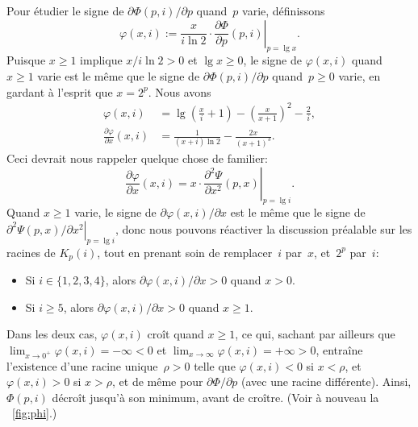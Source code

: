 Pour étudier le signe de \(\partial\Phi(p,i)/\partial p\) quand~\(p\)
varie, définissons
\begin{equation*}
  \varphi(x,i) :=
    \frac{x}{i\ln 2} \cdot
    \left.\frac{\partial\Phi}{\partial p}(p,i)\right|_{p=\lg x}.
\end{equation*}
Puisque \(x \geqslant 1\) implique \(x/i\ln 2 > 0\) et \(\lg x
\geqslant 0\), le signe de \(\varphi(x,i)\) quand~\(x \geqslant 1\)
varie est le même que le signe de \(\partial\Phi(p,i)/\partial p\)
quand~\(p \geqslant 0\) varie, en gardant à l'esprit
que \(x=2^p\). Nous avons
\begin{align*}
\varphi(x,i) &= \lg\left(\frac{x}{i}+1\right) -
\left(\!\frac{x}{x+1}\!\right)^2 - \frac{2}{i},\\
\frac{\partial\varphi}{\partial x}(x,i) &=
\frac{1}{(x+i)\ln 2} - \frac{2x}{(x+1)^3}.
\end{align*}
Ceci devrait nous rappeler quelque chose de familier:
\begin{equation*}
\frac{\partial\varphi}{\partial x}(x,i) =
  x \cdot \left.\frac{\partial^2\Psi}{\partial x^2}(p,x)\right|_{p=\lg
  i}.
\end{equation*}
Quand \(x \geqslant 1\) varie, le signe de
\(\partial\varphi(x,i)/\partial x\) est le même que le signe de
\(\left.\partial^2\Psi(p,x)/\partial x^2\right|_{p=\lg i}\), donc nous
pouvons réactiver la discussion préalable sur les racines de
\(K_p(i)\), tout en prenant soin de remplacer~\(i\) par~\(x\),
et~\(2^p\) par~\(i\):
\begin{itemize}

\item Si \(i \in \{1,2,3,4\}\), alors \(\partial\varphi(x,i)/\partial x
  > 0\) quand \(x > 0\).

\item Si \(i \geqslant 5\), alors \(\partial\varphi(x,i)/\partial x >
  0\) quand \(x \geqslant 1\).

\end{itemize}
Dans les deux cas, \(\varphi(x,i)\) croît quand \(x \geqslant 1\), ce
qui, sachant par ailleurs que \(\lim_{x\to 0^{+}}\varphi(x,i) =
-\infty < 0\) et \(\lim_{x\to\infty}\varphi(x,i) = +\infty > 0\),
entraîne l'existence d'une racine unique~\(\rho > 0\) telle que
\(\varphi(x,i) < 0\) si \(x < \rho\), et \(\varphi(x,i) > 0\) si \(x >
\rho\), et de même pour \(\partial\Phi/\partial p\) (avec une racine
différente). Ainsi, \(\Phi(p,i)\) décroît jusqu'à son minimum, avant
de croître. (Voir à nouveau la \fig~\vref{fig:phi}.)

